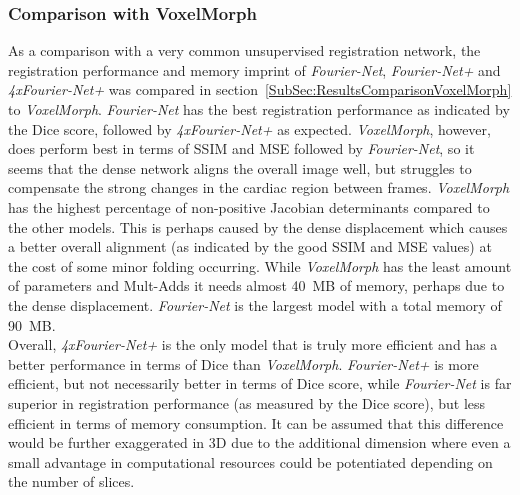 \subsubsection{Comparison with VoxelMorph} \label{SubSubSec:DiscussionComparisonVoxelMorph}
As a comparison with a very common unsupervised registration network, the registration performance and memory imprint of \emph{Fourier-Net}, \emph{Fourier-Net+} and \emph{4xFourier-Net+} was compared in section~\ref{SubSec:ResultsComparisonVoxelMorph} to \emph{VoxelMorph}. \emph{Fourier-Net} has the best registration performance as indicated by the Dice score, followed by \emph{4xFourier-Net+} as expected. \emph{VoxelMorph}, however, does perform best in terms of SSIM and MSE followed by \emph{Fourier-Net}, so it seems that the dense network aligns the overall image well, but struggles to compensate the strong changes in the cardiac region between frames. \emph{VoxelMorph} has the highest percentage of non-positive Jacobian determinants compared to the other models. This is perhaps caused by the dense displacement which causes a better overall alignment (as indicated by the good SSIM and MSE values) at the cost of some minor folding occurring. While \emph{VoxelMorph} has the least amount of parameters and Mult-Adds it needs almost 40~MB of memory, perhaps due to the dense displacement. \emph{Fourier-Net} is the largest model with a total memory of 90~MB. \\
Overall, \emph{4xFourier-Net+} is the only model that is truly more efficient and has a better performance in terms of Dice than \emph{VoxelMorph}. \emph{Fourier-Net+} is more efficient, but not necessarily better in terms of Dice score, while \emph{Fourier-Net} is far superior in registration performance (as measured by the Dice score), but less efficient in terms of memory consumption. It can be assumed that this difference would be further exaggerated in 3D due to the additional dimension where even a small advantage in computational resources could be potentiated depending on the number of slices.


